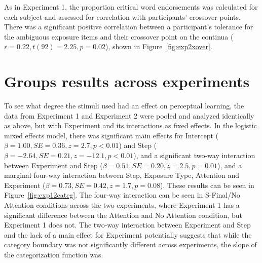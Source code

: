 As in Experiment 1,  the proportion critical word endorsements was calculated for each subject and assessed for correlation with participants' crossover points. There was a significant positive correlation between a participant's tolerance for the ambiguous exposure items and their crossover point on the continua ($r = 0.22, t (92) = 2.25, p = 0.02$), shown in Figure~\ref{fig:exp2xover}.  

\section{Groups results across experiments}

To see what degree the stimuli used had an effect on perceptual learning, the data from Experiment 1 and Experiment 2 were pooled and analyzed identically as above, but with Experiment and its interactions as fixed effects.  In the logistic mixed effects model, there was significant main effects for Intercept ($\beta = 1.00, SE = 0.36, z = 2.7, p < 0.01$) and Step ($\beta = -2.64, SE = 0.21, z = -12.1, p < 0.01$), and a significant two-way interaction between Experiment and Step ($\beta = 0.51, SE = 0.20, z = 2.5, p = 0.01$), and a marginal four-way interaction between Step, Exposure Type, Attention and Experiment ($\beta = 0.73, SE = 0.42, z = 1.7, p = 0.08$).  These results can be seen in Figure~\ref{fig:exp12categ}.  The four-way interaction can be seen in S-Final/No Attention conditions across the two experiments, where Experiment 1 has a significant difference between the Attention and No Attention condition, but Experiment 1 does not.  The two-way interaction between Experiment and Step and the lack of a main effect for Experiment potentially suggests that while the category boundary was not significantly different across experiments, the slope of the categorization function was.

